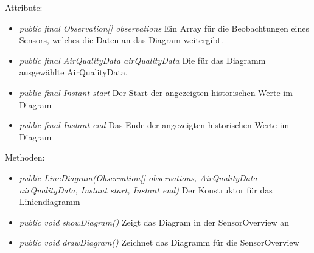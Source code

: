 Attribute:
\begin{itemize}
    \item \emph{public final Observation[] observations} Ein Array für die Beobachtungen eines Sensors, welches die Daten an das Diagram weitergibt.
    \item \emph{public final AirQualityData airQualityData} Die für das Diagramm ausgewählte AirQualityData.
    \item \emph{public final Instant start} Der Start der angezeigten historischen Werte im Diagram
    \item \emph{public final Instant end} Das Ende der angezeigten historischen Werte im Diagram
\end{itemize}
Methoden:
\begin{itemize}
    \item \emph{public LineDiagram(Observation[] observations, AirQualityData airQualityData, Instant start, Instant end)} Der Konstruktor für das Liniendiagramm
    \item \emph{public void showDiagram()} Zeigt das Diagram in der SensorOverview an
    \item \emph{public void drawDiagram()} Zeichnet das Diagramm für die SensorOverview
\end{itemize}
